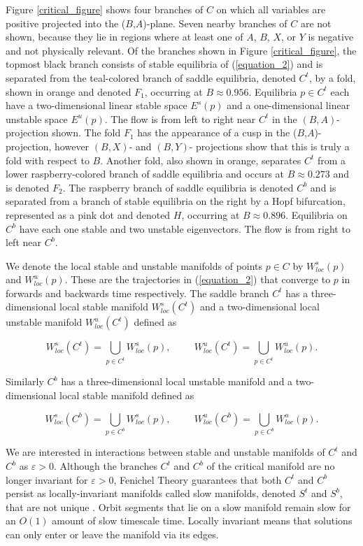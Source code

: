 \documentclass{ws-ijbc}
\begin{document}
Figure \ref{critical_figure} shows four branches of $C$ on which all variables are positive projected into the ($B$,$A$)-plane.  Seven nearby branches of $C$ are not shown, because they lie in regions where at least one of $A$, $B$, $X$, or $Y$ is negative and not physically relevant.  Of the branches shown in Figure \ref{critical_figure}, the topmost black branch consists of stable equilibria of (\ref{equation_2}) and is separated from the teal-colored branch of saddle equilibria, denoted $C^t$, by a fold, shown in orange and denoted $F_1$, occurring at $B \approx 0.956$.  Equilibria $p \in C^t$ each have a two-dimensional linear stable space $E^s(p)$ and a one-dimensional linear unstable space $E^u(p)$.  The flow is from left to right near $C^t$ in the $(B,A)$-projection shown.  The fold $F_1$ has the appearance of a cusp in the ($B$,$A$)-projection, however $(B,X)$- and $(B,Y)$- projections show that this is truly a fold with respect to $B$.  Another fold, also shown in orange, separates $C^t$ from a lower raspberry-colored branch of saddle equilibria and occurs at $B \approx 0.273$ and is denoted $F_2$.  The raspberry branch of saddle equilibria is denoted $C^b$ and is separated from a branch of stable equilibria on the right by a Hopf bifurcation, represented as a pink dot and denoted $H$, occurring at $B \approx 0.896$.  Equilibria on $C^b$ have each one stable and two unstable eigenvectors.  The flow is from right to left near $C^b$.
    
We denote the local stable and unstable manifolds of points $p \in C$ by $W^{s}_{loc}(p)$ and $W^{u}_{loc}(p)$.  These are the trajectories in (\ref{equation_2}) that converge to $p$ in forwards and backwards time respectively.  The saddle branch $C^t$ has a three-dimensional local stable manifold $W^{s}_{loc}(C^t)$ and a two-dimensional local unstable manifold $W^{u}_{loc}(C^t)$ defined as
    
$$W^{s}_{loc}(C^t) = \bigcup_{p \in C^t} W^{s}_{loc}(p), \hspace{1cm} W^{u}_{loc}(C^t) = \bigcup_{p \in C^t} W^{u}_{loc}(p).$$
    
\noindent
Similarly $C^b$ has a three-dimensional local unstable manifold and a two-dimensional local stable manifold defined as
    
$$W^{s}_{loc}(C^b) = \bigcup_{p \in C^b} W^{s}_{loc}(p), \hspace{1cm} W^{u}_{loc}(C^b) = \bigcup_{p \in C^b} W^{u}_{loc}(p).$$
    
We are interested in interactions between stable and unstable manifolds of $C^t$ and $C^b$ as $\varepsilon > 0$.  Although the branches $C^t$ and $C^b$ of the critical manifold are no longer invariant for $\varepsilon > 0$, Fenichel Theory guarantees that both $C^t$ and $C^b$ persist as locally-invariant manifolds called slow manifolds, denoted $S^t$ and $S^b$, that are not unique \cite{Fenichel}. Orbit segments that lie on a slow manifold remain slow for an $O(1)$ amount of slow timescale time.  Locally invariant means that solutions can only enter or leave the manifold via its edges.  
    
\end{document}
